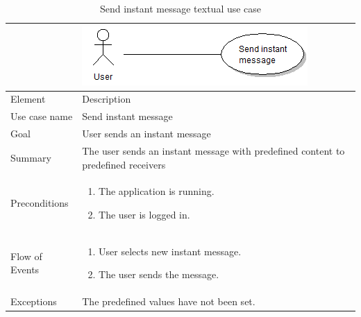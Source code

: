 \begin{table}
\begin{tabular}{p{3cm}p{12cm}}
& \includegraphics{send_instant_message}\\ \hline
Element & Description \\ \hline
Use case name & Send instant message \\
Goal & User sends an instant message \\
Summary & The user sends an instant message with predefined content to predefined receivers \\
Preconditions &
\begin{enumerate}
\item{}The application is running.
\item{}The user is logged in.
\end{enumerate} \\ \hline
Flow of Events &
\begin{enumerate}
\item{}User selects new instant message.
\item{}The user sends the message.
\end{enumerate} \\ \hline
Exceptions & The predefined values have not been set.
\end{tabular}
\caption{Send instant message textual use case} \label{tab:createmessage}
\end{table}

